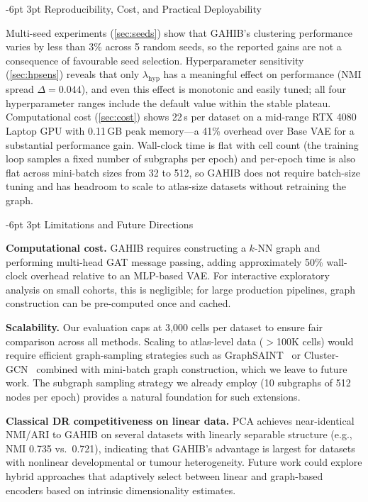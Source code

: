 \documentclass[preprint,12pt]{elsarticle}
\makeatletter
\renewcommand\subsection{\@startsection{subsection}{2}{\z@}%
  {-6pt \@plus -2pt \@minus -2pt}%
  {3pt \@plus 1pt \@minus 1pt}%
  {\normalfont\large\bfseries}}
\makeatother
\begin{document}
\subsection{Reproducibility, Cost, and Practical Deployability}

Multi-seed experiments (\cref{sec:seeds}) show that GAHIB's clustering
performance varies by less than 3\% across 5 random seeds, so the
reported gains are not a consequence of favourable seed selection.
Hyperparameter sensitivity (\cref{sec:hpsens}) reveals that only
$\lambda_\text{hyp}$ has a meaningful effect on performance
(NMI spread $\Delta{=}0.044$), and even this effect is monotonic and
easily tuned; all four hyperparameter ranges include the default value
within the stable plateau.
Computational cost (\cref{sec:cost}) shows 22\,s per dataset on a
mid-range RTX 4080 Laptop GPU with 0.11\,GB peak memory---a 41\%
overhead over Base VAE for a substantial performance gain.
Wall-clock time is flat with cell count (the training loop samples a
fixed number of subgraphs per epoch) and per-epoch time is also flat
across mini-batch sizes from 32 to 512, so GAHIB does not require
batch-size tuning and has headroom to scale to atlas-size datasets
without retraining the graph.

\subsection{Limitations and Future Directions}

\textbf{Computational cost.}
GAHIB requires constructing a $k$-NN graph and performing multi-head
GAT message passing, adding approximately 50\% wall-clock overhead
relative to an MLP-based VAE.
For interactive exploratory analysis on small cohorts, this is negligible;
for large production pipelines, graph construction can be pre-computed
once and cached.

\textbf{Scalability.}
Our evaluation caps at 3{,}000 cells per dataset to ensure fair
comparison across all methods.
Scaling to atlas-level data ($>$100K cells) would require efficient
graph-sampling strategies such as
GraphSAINT~\cite{zeng2020graphsaint} or
Cluster-GCN~\cite{chiang2019clustergcn} combined with
mini-batch graph construction, which we leave to future work.
The subgraph sampling strategy we already employ (10 subgraphs of 512
nodes per epoch) provides a natural foundation for such extensions.

\textbf{Classical DR competitiveness on linear data.}
PCA achieves near-identical NMI/ARI to GAHIB on several datasets with
linearly separable structure (e.g., NMI 0.735 vs.\ 0.721), indicating
that GAHIB's advantage is largest for datasets with nonlinear
developmental or tumour heterogeneity.
Future work could explore hybrid approaches that adaptively select
between linear and graph-based encoders based on intrinsic
dimensionality estimates.
\end{document}
